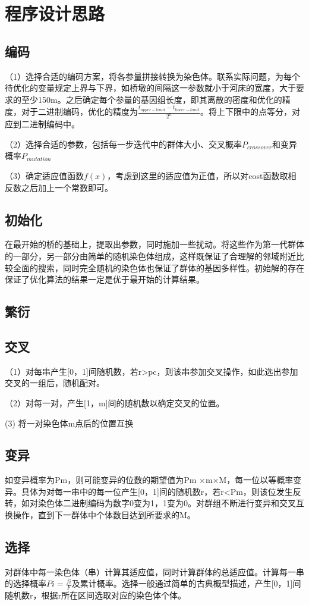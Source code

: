 \documentclass[forprint]{WHUBachelor}
\begin{document}
\section{程序设计思路}
\subsection{编码}
（1）选择合适的编码方案，将各参量拼接转换为染色体。联系实际问题，为每个待优化的变量规定上界与下界，如桥墩的间隔这一参数就小于河床的宽度，大于要求的至少150m。之后确定每个参量的基因组长度，即其离散的密度和优化的精度，对于二进制编码，优化的精度为$\frac{t_{upper-limit}-t_{lower-limit}}{2^n}$。将上下限中的点等分，对应到二进制编码中。\par
（2）选择合适的参数，包括每一步迭代中的群体大小、交叉概率$P_{crossover}$和变异概率$P_{mutation}$\par
（3）确定适应值函数$f(x)$，考虑到这里的适应值为正值，所以对cost函数取相反数之后加上一个常数即可。
\subsection{初始化} 
在最开始的桥的基础上，提取出参数，同时施加一些扰动。将这些作为第一代群体的一部分，另一部分由简单的随机染色体组成，这样既保证了合理解的邻域附近比较全面的搜索，同时完全随机的染色体也保证了群体的基因多样性。初始解的存在保证了优化算法的结果一定是优于最开始的计算结果。
\subsection{繁衍}
\subsection{交叉}
（1）对每串产生[0，1]间随机数，若r>pc，则该串参加交叉操作，如此选出参加交叉的一组后，随机配对。\par
（2）对每一对，产生[1，m]间的随机数以确定交叉的位置。\par
 (3) 将一对染色体m点后的位置互换
\subsection{变异}
如变异概率为Pm，则可能变异的位数的期望值为Pm ×m×M，每一位以等概率变异。具体为对每一串中的每一位产生[0，1]间的随机数r，若r<Pm，则该位发生反转，如对染色体二进制编码为数字0变为1，1变为0。对群组不断进行变异和交叉互换操作，直到下一群体中个体数目达到所要求的M。
\subsection{选择}
对群体中每一染色体（串）计算其适应值，同时计算群体的总适应值。计算每一串的选择概率$Pi=\frac{fi}{F}$及累计概率。选择一般通过简单的古典概型描述，产生[0，1]间随机数r，根据r所在区间选取对应的染色体个体。
\end{document}
